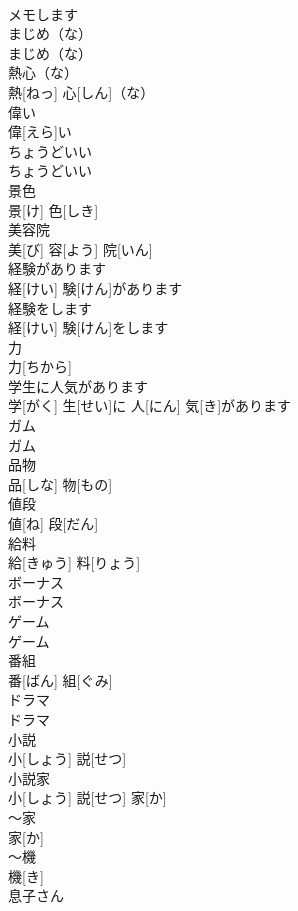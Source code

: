 \documentclass[8pt]{extreport}
\begin{document}
\begin{CJK}{UTF8}{min}
\\	メモします		
\\	まじめ（な）	
\\	まじめ（な）		
\\	熱心（な）	
\\	熱[ねっ] 心[しん]（な）		
\\	偉い	
\\	偉[えら]い		
\\	ちょうどいい	
\\	ちょうどいい		
\\	景色	
\\	景[け] 色[しき]		
\\	美容院	
\\	美[び] 容[よう] 院[いん]		
\\	経験があります	
\\	経[けい] 験[けん]があります		
\\	経験をします	
\\	経[けい] 験[けん]をします		
\\	力	
\\	力[ちから]		
\\	学生に人気があります	
\\	学[がく] 生[せい]に 人[にん] 気[き]があります		
\\	ガム	
\\	ガム		
\\	品物	
\\	品[しな] 物[もの]		
\\	値段	
\\	値[ね] 段[だん]		
\\	給料	
\\	給[きゅう] 料[りょう]		
\\	ボーナス	
\\	ボーナス		
\\	ゲーム	
\\	ゲーム		
\\	番組	
\\	番[ばん] 組[ぐみ]		
\\	ドラマ	
\\	ドラマ		
\\	小説	
\\	小[しょう] 説[せつ]		
\\	小説家	
\\	小[しょう] 説[せつ] 家[か]		
\\	～家	
\\	家[か]		
\\	～機	
\\	機[き]		
\\	息子さん	

\end{CJK}
\end{document}
